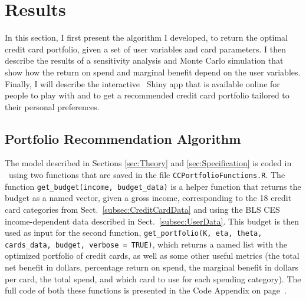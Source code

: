 \section{Results}   \label{sec:Results}

In this section, I first present the algorithm I developed, to return the optimal credit card portfolio, given a set of user variables and card parameters.
I then describe the results of a sensitivity analysis and Monte Carlo simulation that show how the return on spend and marginal benefit depend on the user variables.
Finally, I will describe the interactive \sR\ \textsf{Shiny} app that is available online for people to play with and to get a recommended credit card portfolio tailored to their personal preferences. 

\subsection{Portfolio Recommendation Algorithm}

The model described in Sections \ref{sec:Theory} and \ref{sec:Specification} is coded in \sR\ using two functions that are saved in the file \texttt{CCPortfolioFunctions.R}.
The function \texttt{get\_budget(income, budget\_data)} is a helper function that returns the budget as a named vector, given a gross income, corresponding to the 18 credit card categories from Sect.~\ref{subsec:CreditCardData} and using the BLS CES income-dependent data described in Sect.~\ref{subsec:UserData}.
This budget is then used as input for the second function, \texttt{get\_portfolio(K, eta, theta, cards\_data, budget, verbose = TRUE)}, which returns a named list with the optimized portfolio of credit cards, as well as some other useful metrics (the total net benefit in dollars, percentage return on spend, the marginal benefit in dollars per card, the total spend, and which card to use for each spending category). 
The full code of both these functions is presented in the Code Appendix on page~\pageref{app:Code}. 

